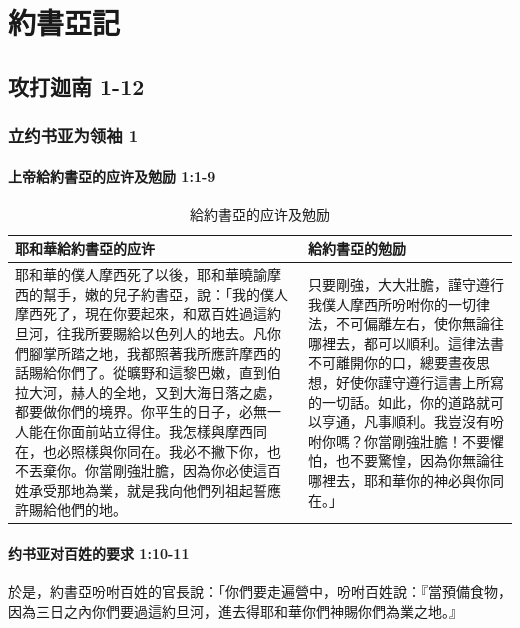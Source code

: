 \chapter{約書亞記}
\section{攻打迦南 1-12 }
\subsection{立约书亚为领袖 1 }
\subsubsection{上帝給約書亞的应许及勉励 1:1-9 }
\begin{table}[H]
\begin{tabular}{ p{10.4cm}|p{6.8cm}} \toprule
耶和華給約書亞的应许&給約書亞的勉励        \\\hline
耶和華的僕人摩西死了以後，耶和華曉諭摩西的幫手，嫩的兒子約書亞，說：「我的僕人摩西死了，現在你要起來，和眾百姓過這約旦河，往我所要賜給以色列人的地去。凡你們腳掌所踏之地，我都照著我所應許摩西的話賜給你們了。從曠野和這黎巴嫩，直到伯拉大河，赫人的全地，又到大海日落之處，都要做你們的境界。你平生的日子，必無一人能在你面前站立得住。我怎樣與摩西同在，也必照樣與你同在。我必不撇下你，也不丟棄你。你當剛強壯膽，因為你必使這百姓承受那地為業，就是我向他們列祖起誓應許賜給他們的地。 &只要剛強，大大壯膽，謹守遵行我僕人摩西所吩咐你的一切律法，不可偏離左右，使你無論往哪裡去，都可以順利。這律法書不可離開你的口，總要晝夜思想，好使你謹守遵行這書上所寫的一切話。如此，你的道路就可以亨通，凡事順利。我豈沒有吩咐你嗎？你當剛強壯膽！不要懼怕，也不要驚惶，因為你無論往哪裡去，耶和華你的神必與你同在。」\\\hline
\bottomrule
\end{tabular}
\caption{給約書亞的应许及勉励}
\label{table:sci}
\end{table}


\subsubsection{约书亚对百姓的要求 1:10-11 }
於是，約書亞吩咐百姓的官長說：「你們要走遍營中，吩咐百姓說：『當預備食物，因為三日之內你們要過這約旦河，進去得耶和華你們神賜你們為業之地。』

